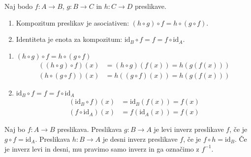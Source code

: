 \begin{trditev}
    Naj bodo $f: A \to B$, $g: B \to C$ in $h: C \to D$ preslikave.
    \begin{enumerate}
        \item Kompozitum preslikav je asociativen: $(h \circ g) \circ f = h \circ (g \circ f)$.
        \item Identiteta je enota za kompozitum: $\text{id}_B \circ f = f = f \circ \text{id}_A$.
    \end{enumerate}
\end{trditev}
\begin{dokaz}
\begin{enumerate}
    \item $(h \circ g) \circ f = h \circ (g \circ f)$
    \begin{align*}
        ((h \circ g) \circ f)(x) &= (h \circ g)(f(x)) = h(g(f(x))) \\
        (h \circ (g \circ f))(x) &= h((g \circ f)(x)) = h(g(f(x)))
    \end{align*}
    \item $\text{id}_B \circ f = f = f \circ \text{id}_A$
    \begin{align*}
        (\text{id}_B \circ f)(x) &= \text{id}_B(f(x)) = f(x) \\
        (f \circ \text{id}_A)(x) &= f(\text{id}_A(x)) = f(x)
    \end{align*}
\end{enumerate}
\end{dokaz}

\begin{definicija}
    Naj bo $f: A \to B$ preslikava.
    Preslikava $g: B \to A$ je levi inverz preslikave $f$, če je $g \circ f = \text{id}_A$.
    Preslikava $h: B \to A$ je desni inverz preslikave $f$, če je $f \circ h = \text{id}_B$.
    Če je inverz levi in desni, mu pravimo samo inverz in ga označimo z $f^{-1}$.
\end{definicija}

